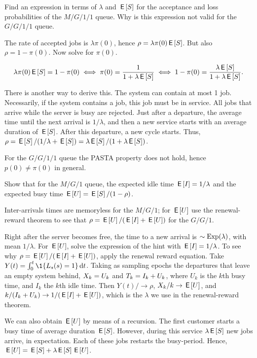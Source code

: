 \begin{exercise}
Find an expression in terms of $\lambda$ and $\,\mathsf{E}\left[S\right]$ for the acceptance and loss probabilities of  the $M/G/1/1$ queue.
Why is this expression not valid for the $G/G/1/1$ queue.
\begin{hint}
 The rate of accepted jobs is $\lambda \pi(0)$, hence $\rho= \lambda \pi(0) \,\mathsf{E}\left[S\right]$. 
But also $\rho = 1-\pi(0)$.  Now solve for $\pi(0)$.
\end{hint}
\begin{solution}
 \begin{equation*}
 \lambda\pi(0) \,\mathsf{E}\left[S\right] = 1 - \pi(0) \iff \pi(0)=\frac1{1+\lambda\,\mathsf{E}\left[S\right]} 
\iff 1-\pi(0) = \frac{\lambda \,\mathsf{E}\left[S\right]}{1+\lambda \,\mathsf{E}\left[S\right]}.
 \end{equation*}

 There is another way to derive this.
 The system can contain at most 1 job.
 Necessarily, if the system contains a job, this job must be in service.
 All jobs that arrive while the server is busy are rejected.
 Just after a departure, the average time until the next arrival is $1/\lambda$, and then a new service starts with an average duration of $\,\mathsf{E}\left[S\right]$.
 After this departure, a new cycle starts.
 Thus, $\rho = \,\mathsf{E}\left[S\right]/(1/\lambda + \,\mathsf{E}\left[S\right]) = \lambda \,\mathsf{E}\left[S\right]/ (1 + \lambda \,\mathsf{E}\left[S\right])$.


For the $G/G/1/1$ queue the PASTA property does not hold, hence $p(0)\neq \pi(0)$ in general.
\end{solution}
\end{exercise}


\begin{exercise}\label{ex:57}
 Show that for the $M/G/1$ queue, the expected idle time 
 $\,\mathsf{E}\left[I\right] = 1/\lambda$ and the expected busy time $\,\mathsf{E}\left[U\right] = \,\mathsf{E}\left[S\right]/(1-\rho)$. 
\begin{hint}
 Inter-arrivals times  are memoryless for the $M/G/1$; for $\,\mathsf{E}\left[U\right]$ use the renewal-reward theorem to see that  $\rho = \,\mathsf{E}\left[U\right]/(\,\mathsf{E}\left[I\right] + \,\mathsf{E}\left[U\right])$ for the $G/G/1$.
\end{hint}
\begin{solution}
  Right after the server becomes free, the time to a new arrival is $\sim\operatorname{Exp}(\lambda)$, with mean $1/\lambda$.
  For $\,\mathsf{E}\left[U\right]$, solve the expression of the hint with $\,\mathsf{E}\left[I\right] = 1/\lambda$.
  To see why $\rho = \,\mathsf{E}\left[U\right]/(\,\mathsf{E}\left[I\right] + \,\mathsf{E}\left[U\right])$, apply the renewal reward equation.
  Take $Y(t) = \int_0^t \1{\Ls(s)=1} \d t$.
  Taking as sampling epochs the departures that leave an empty system behind, $X_k = U_k$ and $T_k = I_k + U_k$, where $U_k$ is the $k$th busy time, and $I_k$ the $k$th idle time.
Then $Y(t)/\to\rho$, $X_k/k \to \,\mathsf{E}\left[U\right]$, and $k/(I_k + U_k) \to 1/(\,\mathsf{E}\left[I\right] + \,\mathsf{E}\left[U\right])$, which is the $\lambda$ we use in the renewal-reward theorem.

We can also obtain $\,\mathsf{E}\left[U\right]$ by means of a recursion. The first customer starts a busy time of average duration $\,\mathsf{E}\left[S\right]$. However, during this service $\lambda \,\mathsf{E}\left[S\right]$ new jobs arrive, in expectation. Each of these jobs restarts the busy-period. Hence, $\,\mathsf{E}\left[U\right] = \,\mathsf{E}\left[S\right] + \lambda \,\mathsf{E}\left[S\right] \,\mathsf{E}\left[U\right]$. 
\end{solution}
\end{exercise}



